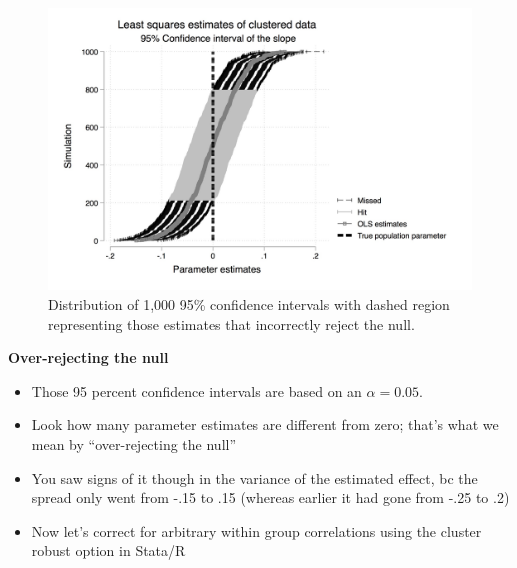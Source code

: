 \documentclass[notes=show]{beamer}
\begin{document}
\begin{frame}[plain]

\begin{figure}[htb]\centering \includegraphics[scale=0.15]{./lecture_includes/ls_ci_clust.jpg}
\caption{Distribution of 1,000 95\% confidence intervals with dashed region representing those estimates that incorrectly reject the null.}
\end{figure}

\end{frame}

\begin{frame}[plain]
\begin{center}
\textbf{Over-rejecting the null}
\end{center}

\begin{itemize}
\item Those 95 percent confidence intervals are based on an $\alpha=0.05$.
\item Look how many parameter estimates are different from zero; that's what we mean by ``over-rejecting the null''
\item You saw signs of it though in the variance of the estimated effect, bc the spread only went from -.15 to .15 (whereas earlier it had gone from -.25 to .2)
\item Now let's correct for arbitrary within group correlations using the cluster robust option in Stata/R
\end{itemize}

\end{frame}
\end{document}
